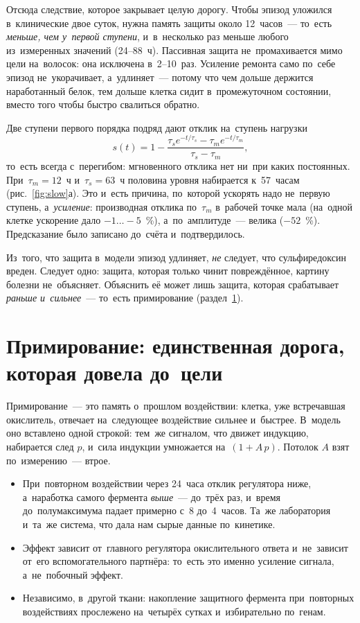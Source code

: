 Отсюда следствие, которое закрывает целую дорогу. Чтобы эпизод уложился в~клинические двое суток, нужна память защиты около 12~часов~--- то~есть \emph{меньше, чем у~первой ступени}, и~в~несколько раз меньше любого из~измеренных значений (24--88~ч). Пассивная защита не~промахивается мимо цели на~волосок: она исключена в~2--10~раз. Усиление ремонта само по~себе эпизод не~укорачивает, а~удлиняет~--- потому что чем дольше держится наработанный белок, тем дольше клетка сидит в~промежуточном состоянии, вместо того чтобы быстро свалиться обратно.

\begin{ineq}
Две ступени первого порядка подряд дают отклик на~ступень нагрузки
\[s(t)=1-\frac{\tau_s e^{-t/\tau_s}-\tau_m e^{-t/\tau_m}}{\tau_s-\tau_m},\]
то~есть всегда с~перегибом: мгновенного отклика нет ни~при каких постоянных. При~$\tau_m=12$~ч и~$\tau_s=63$~ч половина уровня набирается к~57~часам (рис.~\ref{fig:slow}а). Это и~есть причина, по~которой ускорять надо не~первую ступень, а~\emph{усиление}: производная отклика по~$\tau_m$ в~рабочей точке мала (на~одной клетке ускорение дало $-1\dots-5$~\%), а~по~амплитуде~--- велика ($-52$~\%). Предсказание было записано до~счёта и~подтвердилось.
\end{ineq}

\begin{note}
Из~того, что защита в~модели эпизод удлиняет, \emph{не} следует, что сульфиредоксин вреден. Следует одно: защита, которая только чинит повреждённое, картину болезни не~объясняет. Объяснить её может лишь защита, которая срабатывает \emph{раньше и~сильнее}~--- то~есть примирование (раздел~\ref{sec:prime}).
\end{note}

\section{Примирование: единственная дорога, которая довела до~цели}\label{sec:prime}
Примирование~--- это память о~прошлом воздействии: клетка, уже встречавшая окислитель, отвечает на~следующее воздействие сильнее и~быстрее. В~модель оно вставлено одной строкой: тем~же сигналом, что движет индукцию, набирается след $p$, и~сила индукции умножается на~$(1+A\,p)$. Потолок $A$ взят по~измерению~--- втрое.

\facts
\begin{itemize}
\item При~повторном воздействии через 24~часа отклик регулятора ниже, а~наработка самого фермента \emph{выше}~--- до~трёх раз, и~время до~полумаксимума падает примерно с~8 до~4~часов. Та~же лаборатория и~та~же система, что дала нам сырые данные по~кинетике.\tS
\item Эффект зависит от~главного регулятора окислительного ответа и~не~зависит от~его вспомогательного партнёра: то~есть это именно усиление сигнала, а~не~побочный эффект.\tS
\item Независимо, в~другой ткани: накопление защитного фермента при~повторных воздействиях прослежено на~четырёх сутках и~избирательно по~генам.\tP
\end{itemize}

